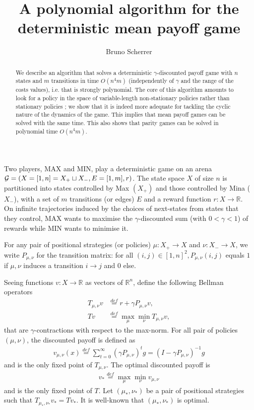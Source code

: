 \documentclass{article}
\title{A polynomial algorithm for the deterministic mean payoff game}
\author{Bruno Scherrer}
\def\R{\mathds R}
\def\={\stackrel{def}{=}}
\begin{document}
\maketitle

\begin{abstract}
  We describe an algorithm that solves a deterministic $\gamma$-discounted payoff game with $n$ states and $m$ transitions in time $O(n^4 m)$ (independently of $\gamma$ and the range of the costs values), i.e. that is strongly polynomial. The core of this algorithm amounts to look for a policy in the space of variable-length non-stationary policies rather than stationary policies ; we show that it is indeed more adequate for tackling the cyclic nature of the dynamics of the game. This implies that mean payoff games can be solved with the same time. This also shows that parity games can be solved in polynomial time $O(n^4 m)$.
\end{abstract}
  


Two players, MAX and MIN, play a deterministic game on an arena ${\cal G}=(X=[1,n]=X_+ \sqcup X_-,E=[1,m],r)$.
The state space $X$ of size $n$ is partitioned into states  controlled by Max
$(X_+)$ and those controlled by Mina
($X_-$), with a set of $m$ transitions (or edges) $E$ and a reward function $r:X \to \R$.
On infinite trajectories induced by the choices of next-states from states that they control, MAX wants to maximise the $\gamma$-discounted sum (with $0<\gamma<1$) of rewards while MIN wants to minimise it.

For any pair of positional strategies (or policies) $\mu:X_+ \to X$ and $\nu:X_- \to X$, we write $P_{\mu,\nu}$ for the transition matrix:
  for all $(i,j)\in [1,n]^2, P_{\mu,\nu}(i,j)$ equals $1$ if $\mu,\nu$ induces a transition $i \to j$ and $0$ else.

Seeing functions $v:X \to \R$ as vectors of $\R^n$, define the following Bellman operators
\begin{align}
T_{\mu,\nu}v & \= r + \gamma P_{\mu,\nu}v, \\
T v & \=\max_\mu \min_\nu T_{\mu,\nu }v,
\end{align}
that are $\gamma$-contractions with respect to the max-norm.
For all pair of policies $(\mu,\nu)$, the discounted payoff is defined as
\begin{align}
v_{\mu,\nu}(x) \= \sum_{t=0}^\infty (\gamma P_{\mu,\nu})^t g = (I-\gamma P_{\mu,\nu})^{-1}g
\end{align}
and is the only fixed point of $T_{\mu,\nu}$.
The optimal discounted payoff is
\begin{align}
  v_* \= \max_{\mu} \min_{\nu} v_{\mu,\nu}
\end{align}
and is the only fixed point of  $T$.
Let $(\mu_*,\nu_*)$ be a pair of positional strategies such that $T_{\mu_*,\nu_*}v_*=T v_*$. It is well-known that $(\mu_*,\nu_*)$ is optimal.





\end{document}
